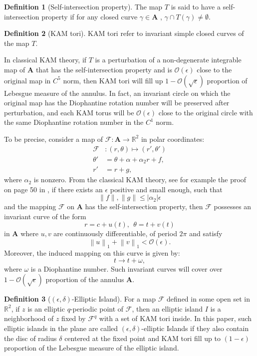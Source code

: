 \documentclass{article}
\numberwithin{figure}{section}
\numberwithin{equation}{section}
\theoremstyle{remark}
\theoremstyle{definition}
\newtheorem{definition}{Definition}
\begin{document}
\begin{definition}[Self-intersection property]
	The map $T$ is said to have a self-intersection property if for any closed curve $\gamma \in \textbf{A}$ , $\gamma \cap T(\gamma) \neq \emptyset$. 
\end{definition}

\begin{definition}[KAM tori]
KAM tori refer to invariant simple closed curves of the map $T$.
\end{definition}
In classical KAM theory, if $T$ is a perturbation of a non-degenerate integrable map of $\textbf{A}$ that has the self-intersection property and is $\mathcal{O}(\epsilon)$ close to the original map in $C^5$ norm, then KAM tori will fill up $1-\mathcal{O}(\sqrt{\epsilon})$ proportion of Lebesgue measure of the annulus. In fact, an invariant circle on which the original map has the Diophantine rotation number will be preserved after perturbation, and each KAM torus will be $\mathcal{O}(\epsilon)$ close to the original circle with the same Diophantine rotation number in the $C^1$ norm.

To be precise, consider a map of $\mathcal{F}:\textbf{A} \rightarrow   \mathbb{R}^2$ in polar coordinates:
	\begin{align*}
	 \mathcal{F}&: \left(r,\theta\right)\mapsto \left(r',\theta'\right)\\
	\theta'&=\theta+\alpha+\alpha_2r+f,\\
	r' &= r +g,
    \end{align*}	
where $\alpha_2$ is nonzero. From the classical KAM theory, see for example the proof on page 50 in \cite{Moser+2001}, if there exists an $\epsilon$ positive and small enough, such that 
{\color{red}$$\|f\|,\|g\| \leq |\alpha_2|\epsilon$$} 
and the mapping $\mathcal{F}$ on $\textbf{A}$ has the self-intersection property, then $\mathcal{F}$
possesses an invariant curve of the form 
$$r=c+u(t),\ \ \theta=t+v(t)$$
in $\textbf{A}$ where $u,v$ are continuously differentiable, of period $2\pi$ and satisfy
$$\left\|u\right\|_1+\left\|v\right\|_1<\mathcal{O}\left(\epsilon\right).$$
Moreover, the induced mapping on this curve is given by:
$$t \rightarrow t+\omega,$$
where $\omega$ is a Diophantine number. Such invariant curves will cover over $1-\mathcal{O}\left(\sqrt{\epsilon}\right)$ proportion of the annulus $\textbf{A}$.
\begin{definition}[$(\epsilon,\delta)$-Elliptic Island]
For a map $\mathcal{F}$ defined in some open set in $\mathbb{R}^2$, if $z$ is an elliptic $q$-periodic point of $\mathcal{F}$, then an elliptic island $I$ is a neighborhood of $z$ fixed by $\mathcal{F}^q$ with a set of KAM tori inside. In this paper, such elliptic islands in the plane are called  $(\epsilon,\delta)$-elliptic Islands if they also contain the disc of radius $\delta$ centered at the fixed point and KAM tori fill up to $(1-\epsilon)$ proportion of the Lebesgue measure of the elliptic island.
\end{definition}
\end{document}
